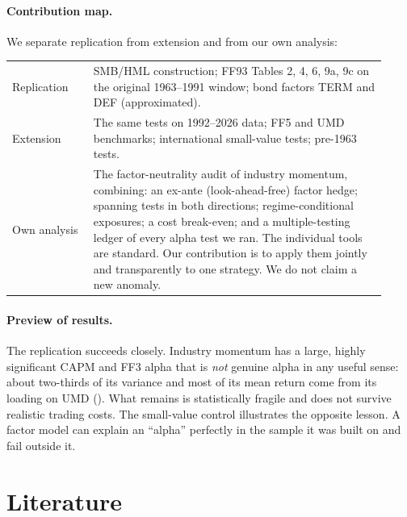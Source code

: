 \documentclass[11pt]{article}
\begin{document}
\paragraph{Contribution map.} We separate replication from extension and from our own analysis:
\begin{center}
\small
\begin{tabular}{p{0.2\linewidth}p{0.72\linewidth}}
\toprule
Replication & SMB/HML construction; FF93 Tables 2, 4, 6, 9a, 9c on the original 1963--1991 window; bond factors TERM and DEF (approximated). \\
Extension & The same tests on 1992--2026 data; FF5 and UMD benchmarks; international small-value tests; pre-1963 tests. \\
Own analysis & The factor-neutrality audit of industry momentum, combining: an ex-ante (look-ahead-free) factor hedge; spanning tests in both directions; regime-conditional exposures; a cost break-even; and a multiple-testing ledger of every alpha test we ran. The individual tools are standard. Our contribution is to apply them jointly and transparently to one strategy. We do not claim a new anomaly. \\
\bottomrule
\end{tabular}
\end{center}

\paragraph{Preview of results.} The replication succeeds closely. Industry momentum has a large, highly significant CAPM and FF3 alpha that is \emph{not} genuine alpha in any useful sense: about two-thirds of its variance and most of its mean return come from its loading on UMD (\ImomUmdBeta). What remains is statistically fragile and does not survive realistic trading costs. The small-value control illustrates the opposite lesson. A factor model can explain an ``alpha'' perfectly in the sample it was built on and fail outside it.

\section{Literature}
\end{document}
